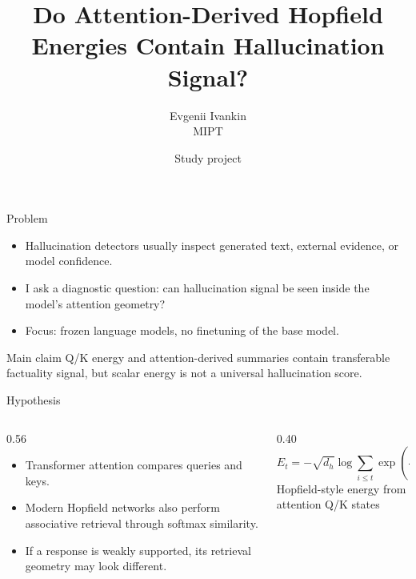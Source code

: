 \documentclass[aspectratio=169]{beamer}
\title[Hopfield Energy for Hallucination Detection]{Do Attention-Derived Hopfield Energies Contain Hallucination Signal?}
\author{Evgenii Ivankin \\ MIPT}
\date{Study project}
\begin{document}
\begin{frame}
  \titlepage
\end{frame}

\begin{frame}{Problem}
  \begin{itemize}
    \item Hallucination detectors usually inspect generated text, external evidence, or model confidence.
    \item I ask a diagnostic question: can hallucination signal be seen inside the model's attention geometry?
    \item Focus: frozen language models, no finetuning of the base model.
  \end{itemize}

  \vspace{0.4cm}
  \begin{block}{Main claim}
    Q/K energy and attention-derived summaries contain transferable factuality signal, but scalar energy is not a universal hallucination score.
  \end{block}
\end{frame}

\begin{frame}{Hypothesis}
  \begin{columns}
    \begin{column}{0.56\linewidth}
      \begin{itemize}
        \item Transformer attention compares queries and keys.
        \item Modern Hopfield networks also perform associative retrieval through softmax similarity.
        \item If a response is weakly supported, its retrieval geometry may look different.
      \end{itemize}
    \end{column}
    \begin{column}{0.40\linewidth}
      \begin{equation*}
      E_t = -\sqrt{d_h}\log \sum_{i \le t}
      \exp\left(\frac{q_t^\top k_i}{\sqrt{d_h}}\right)
      \end{equation*}
      \centering
      \small Hopfield-style energy from attention Q/K states
    \end{column}
  \end{columns}
\end{frame}
\end{document}
